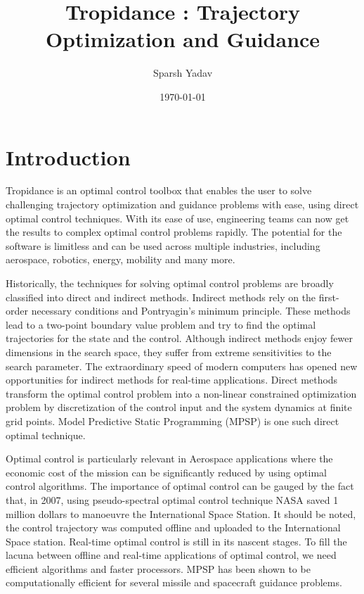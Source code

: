 \documentclass[12pt]{article}
\title{Tropidance : Trajectory Optimization and Guidance}
\author{Sparsh Yadav}
\date{\today}
\begin{document}
\maketitle{}

\tableofcontents

\clearpage
\newpage

\section{Introduction}

Tropidance is an optimal control toolbox that enables the user to solve challenging trajectory optimization and guidance problems with ease, using direct optimal control techniques. With its ease of use, engineering teams can now get the results to complex optimal control problems rapidly. The potential for the software is limitless and can be used across multiple industries, including aerospace, robotics, energy, mobility and many more. 

Historically, the techniques for solving optimal control problems are broadly classified into direct and indirect methods. Indirect methods rely on the first-order necessary conditions and Pontryagin's minimum principle. These methods lead to a two-point boundary value problem and try to find the optimal trajectories for the state and the control. Although indirect methods enjoy fewer dimensions in the search space, they suffer from extreme sensitivities to the search parameter. The extraordinary speed of modern computers has opened new opportunities for indirect methods for real-time applications. Direct methods transform the optimal control problem into a non-linear constrained optimization problem by discretization of the control input and the system dynamics at finite grid points. Model Predictive Static Programming (MPSP) is one such direct optimal technique.

Optimal control is particularly relevant in Aerospace applications where the economic cost of the mission can be significantly reduced by using optimal control algorithms. The importance of optimal control can be gauged by the fact that, in 2007, using pseudo-spectral optimal control technique  NASA saved 1 million dollars to manoeuvre the International Space Station. It should be noted, the control trajectory was computed offline and uploaded to the International Space station.  Real-time optimal control is still in its nascent stages. To fill the lacuna between offline and real-time applications of optimal control, we need efficient algorithms and faster processors. MPSP has been shown to be computationally efficient for several missile and spacecraft guidance problems. 
\end{document}
